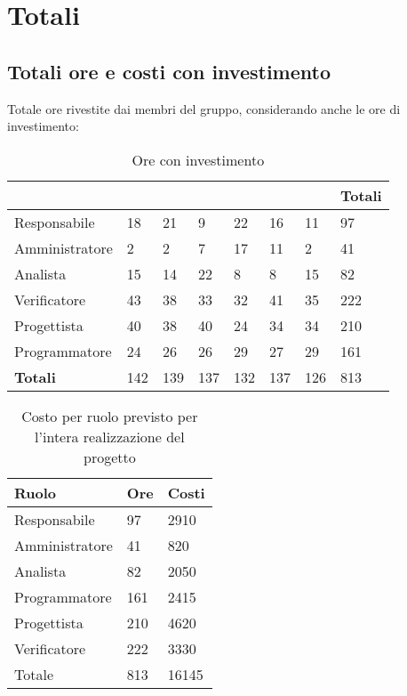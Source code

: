 \section{Totali}{
 \subsection{Totali ore e costi con investimento}
	\label{totOreInvest}
		Totale ore rivestite dai membri del gruppo, considerando anche le ore di investimento:
		\begin{table}[H] 
			\begin{tabular}{|p{}|p{}
												p{\dimexpr 0.12\linewidth-2\tabcolsep}p{}
												p{}p{}
												p{} || p{}|}
				 		\hline
			 & \TP & \VG & \FM & \BM & \PM & \GP& \textbf{Totali} \\
			 \hline
			 Responsabile & 18 & 21 & 9 & 22 & 16 & 11 & 97\\
			 \hline
			 Amministratore & 2 & 2 & 7 & 17 & 11 & 2 & 41\\
			 \hline
			 Analista & 15 & 14 & 22 & 8 & 8 & 15 & 82 \\
			 \hline
			 Verificatore & 43 & 38 & 33 & 32 & 41 & 35 & 222\\
			 \hline
			 Progettista & 40 & 38 & 40 & 24 & 34 & 34 & 210\\
			 \hline
			 Programmatore & 24 & 26 & 26 & 29 & 27 & 29 & 161\\
			 \hline \hline
				\textbf{Totali} & 142 & 139 & 137 & 132 & 137 & 126 & 813\\
				\hline
			\end{tabular}
			\caption{Ore con investimento}
			\label{tab:investimento}
		\end{table}

	\begin{table}[H]
	 \centering
	 \begin{tabular}{p{}p{}
		  	  		  				p{}}
	  \toprule Ruolo & Ore  & Costi \\
	  \midrule
	  Responsabile & 97  & 2910 \\
	  Amministratore & 41 & 820 \\
	  Analista & 82 & 2050 \\
	  Programmatore & 161  & 2415 \\
	  Progettista & 210  & 4620 \\
	  Verificatore & 222  & 3330 \\
	  \hline
	  Totale & 813  & 16145 \\
	  \bottomrule
	 \end{tabular}
	 \label{tab:costoinvestimento}
	 \caption{Costo per ruolo previsto per l’intera realizzazione del progetto}
	\end{table}

}
